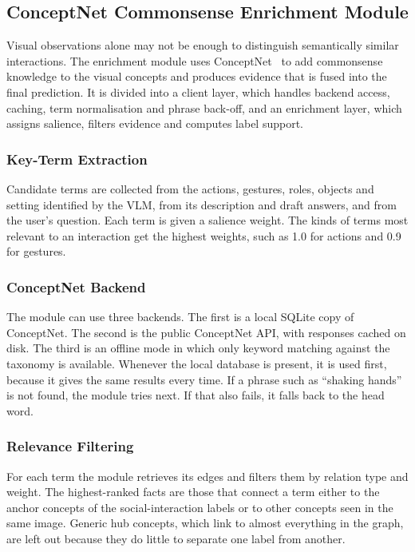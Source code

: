 \subsection{ConceptNet Commonsense Enrichment Module}
\label{sec:conceptnet}

Visual observations alone may not be enough to distinguish semantically similar interactions. The enrichment module uses ConceptNet~\cite{speer2017conceptnet} to add commonsense knowledge to the visual concepts and produces evidence that is fused into the final prediction. It is divided into a client layer, which handles backend access, caching, term normalisation and phrase back-off, and an enrichment layer, which assigns salience, filters evidence and computes label support.

\subsubsection{Key-Term Extraction}
Candidate terms are collected from the actions, gestures, roles, objects and setting identified by the VLM, from its description and draft answers, and from the user's question. Each term is given a salience weight. The kinds of terms most relevant to an interaction get the highest weights, such as 1.0 for actions and 0.9 for gestures.

\subsubsection{ConceptNet Backend}
The module can use three backends. The first is a local SQLite copy of ConceptNet. The second is the public ConceptNet API, with responses cached on disk. The third is an offline mode in which only keyword matching against the taxonomy is available. Whenever the local database is present, it is used first, because it gives the same results every time. If a phrase such as ``shaking hands'' is not found, the module tries  next. If that also fails, it falls back to the head word.

\subsubsection{Relevance Filtering}
For each term the module retrieves its edges and filters them by relation type and weight. The highest-ranked facts are those that connect a term either to the anchor concepts of the social-interaction labels or to other concepts seen in the same image. Generic hub concepts, which link to almost everything in the graph, are left out because they do little to separate one label from another.

